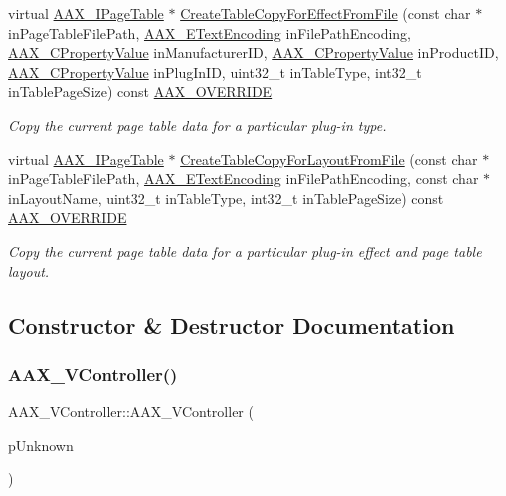 \begin{DoxyCompactItemize}
virtual \mbox{\hyperlink{a01849}{A\+A\+X\+\_\+\+I\+Page\+Table}} $\ast$ \mbox{\hyperlink{a01905_aca7ea0ddba3b3a6ae714813f12ec0515}{Create\+Table\+Copy\+For\+Effect\+From\+File}} (const char $\ast$in\+Page\+Table\+File\+Path, \mbox{\hyperlink{a00491_a8152e57310850693e4e7f00fc4922d74}{A\+A\+X\+\_\+\+E\+Text\+Encoding}} in\+File\+Path\+Encoding, \mbox{\hyperlink{a00392_ab247c0d8686c14e05cbb567ef276f249}{A\+A\+X\+\_\+\+C\+Property\+Value}} in\+Manufacturer\+ID, \mbox{\hyperlink{a00392_ab247c0d8686c14e05cbb567ef276f249}{A\+A\+X\+\_\+\+C\+Property\+Value}} in\+Product\+ID, \mbox{\hyperlink{a00392_ab247c0d8686c14e05cbb567ef276f249}{A\+A\+X\+\_\+\+C\+Property\+Value}} in\+Plug\+In\+ID, uint32\+\_\+t in\+Table\+Type, int32\+\_\+t in\+Table\+Page\+Size) const \mbox{\hyperlink{a00392_ac2f24a5172689ae684344abdcce55463}{A\+A\+X\+\_\+\+O\+V\+E\+R\+R\+I\+DE}}
\begin{DoxyCompactList}\small\item\em Copy the current page table data for a particular plug-\/in type. \end{DoxyCompactList}\item 
virtual \mbox{\hyperlink{a01849}{A\+A\+X\+\_\+\+I\+Page\+Table}} $\ast$ \mbox{\hyperlink{a01905_afc6f8557185c674951f9c4568a9a95b3}{Create\+Table\+Copy\+For\+Layout\+From\+File}} (const char $\ast$in\+Page\+Table\+File\+Path, \mbox{\hyperlink{a00491_a8152e57310850693e4e7f00fc4922d74}{A\+A\+X\+\_\+\+E\+Text\+Encoding}} in\+File\+Path\+Encoding, const char $\ast$in\+Layout\+Name, uint32\+\_\+t in\+Table\+Type, int32\+\_\+t in\+Table\+Page\+Size) const \mbox{\hyperlink{a00392_ac2f24a5172689ae684344abdcce55463}{A\+A\+X\+\_\+\+O\+V\+E\+R\+R\+I\+DE}}
\begin{DoxyCompactList}\small\item\em Copy the current page table data for a particular plug-\/in effect and page table layout. \end{DoxyCompactList}\end{DoxyCompactItemize}


\subsection{Constructor \& Destructor Documentation}
\mbox{\label{a01905_ae2076dd569e3ae5e2bdc3934e3392493}} 
\subsubsection{\texorpdfstring{AAX\_VController()}{AAX\_VController()}}
{\footnotesize\ttfamily A\+A\+X\+\_\+\+V\+Controller\+::\+A\+A\+X\+\_\+\+V\+Controller (\begin{DoxyParamCaption}\item[{\mbox{\hyperlink{a01409}{I\+A\+C\+F\+Unknown}} $\ast$}]{p\+Unknown }\end{DoxyParamCaption})}

